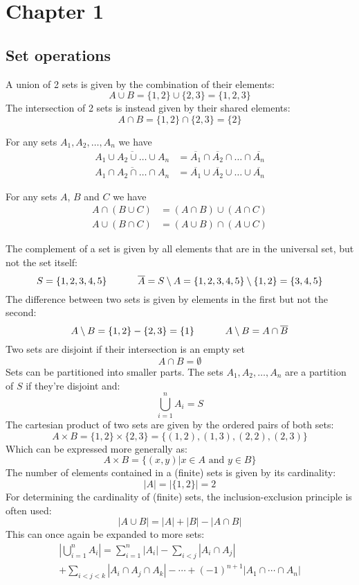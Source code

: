 \section{Chapter 1}
\subsection{Set operations}
A union of 2 sets is given by the combination of their elements:
\[
    A\cup B = \{1,2\}\cup\{2,3\}=\{1,2,3\}
\]
The intersection of 2 sets is instead given by their shared elements:
\[
    A\cap B=\{1,2\}\cap\{2,3\}=\{2\}
\]
\begin{theorem}
  For any sets $A_1,A_2,\ldots,A_n$ we have
  \begin{align*}
    \overline{A_1\cup A_2\cup \ldots \cup A_n}&=\overline{A_1}\cap\overline{A_2}\cap\ldots\cap\overline{A_n} \\
    \overline{A_1\cap A_2\cap\ldots\cap A_n}&=\overline{A_1}\cup\overline{A_2}\cup\ldots\cup\overline{A_n}
  \end{align*}
\end{theorem}

\begin{theorem}
  For any sets $A$, $B$ and $C$ we have
  \begin{align*}
      A\cap(B\cup C)&=(A\cap B)\cup (A\cap C) \\
      A\cup(B\cap C)&=(A\cup B)\cap (A\cup C)
  \end{align*}
\end{theorem}
The complement of a set is given by all elements that are in the universal set, but not the set itself:
\[
    S=\{1,2,3,4,5\}\hskip 32pt \overline{A}=S\setminus A=\{1,2,3,4,5\}\setminus\{1,2\}=\{3,4,5\}
\]
The difference between two sets is given by elements in the first but not the second:
\[
    A\setminus B=\{1,2\}-\{2,3\}=\{1\}\hskip 32pt A\setminus B=A\cap\overline{B}
\]
Two sets are disjoint if their intersection is an empty set
\[
    A\cap B=\emptyset
\]
Sets can be partitioned into smaller parts. The sets $A_1,A_2,\ldots,A_n$ are a partition of $S$ if they're disjoint and:
\[
    \bigcup_{i=1}^n A_i=S
\]
The cartesian product of two sets are given by the ordered pairs of both sets:
\[
    A\times B=\{1,2\}\times\{2,3\}=\{(1,2),(1,3),(2,2),(2,3)\}
\]
Which can be expressed more generally as:
\[
    A\times B=\{(x,y)|x\in A \text{ and } y\in B\}
\]
The number of elements contained in a (finite) sets is given by its cardinality:
\[
    |A|=|\{1,2\}|=2
\]
For determining the cardinality of (finite) sets, the inclusion-exclusion principle is often used:
\[
    |A\cup B|=|A|+|B|-|A\cap B|
\]
This can once again be expanded to more sets:
\begin{equation*}
    \begin{gathered}
    |\bigcup_{i=1}^n A_i|=\sum_{i=1}^n |A_i|-\sum_{i<j}|A_i\cap A_j| \\
    +\sum_{i<j<k}|A_i\cap A_j\cap A_k|-\cdots +(-1)^{n+1}|A_1\cap \cdots\cap A_n|
    \end{gathered}
\end{equation*}
